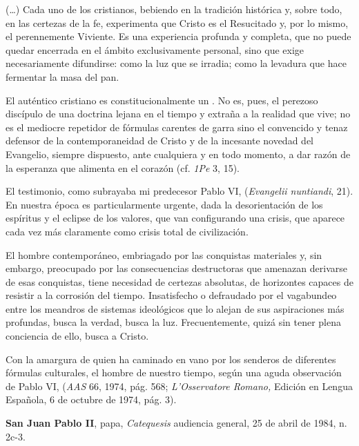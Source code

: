 \begin{patercite}
(\ldots) Cada uno de los cristianos, bebiendo en la tradición histórica y, sobre todo, en las certezas de la fe, experimenta que Cristo es el Resucitado y, por lo mismo, el perennemente Viviente. Es una experiencia profunda y completa, que no puede quedar encerrada en el ámbito exclusivamente personal, sino que exige necesariamente difundirse: como la luz que se irradia; como la levadura que hace fermentar la masa del pan.

El auténtico cristiano es constitucionalmente un . No es, pues, el perezoso discípulo de una doctrina lejana en el tiempo y extraña a la realidad que vive; no es el mediocre repetidor de fórmulas carentes de garra sino el convencido y tenaz defensor de la contemporaneidad de Cristo y de la incesante novedad del Evangelio, siempre dispuesto, ante cualquiera y en todo momento, a dar razón de la esperanza que alimenta en el corazón (cf. \emph{1Pe} 3, 15).

El testimonio, como subrayaba mi predecesor Pablo VI,  (\emph{Evangelii nuntiandi}, 21). En nuestra época es particularmente urgente, dada la desorientación de los espíritus y el eclipse de los valores, que van configurando una crisis, que aparece cada vez más claramente como crisis total de civilización.

El hombre contemporáneo, embriagado por las conquistas materiales y, sin embargo, preocupado por las consecuencias destructoras que amenazan derivarse de esas conquistas, tiene necesidad de certezas absolutas, de horizontes capaces de resistir a la corrosión del tiempo. Insatisfecho o defraudado por el vagabundeo entre los meandros de sistemas ideológicos que lo alejan de sus aspiraciones más profundas, busca la verdad, busca la luz. Frecuentemente, quizá sin tener plena conciencia de ello, busca a Cristo.

Con la amargura de quien ha caminado en vano por los senderos de diferentes fórmulas culturales, el hombre de nuestro tiempo, según una aguda observación de Pablo VI,  (\emph{AAS} 66, 1974, pág. 568; \emph{L'Osservatore Romano,} Edición en Lengua Española, 6 de octubre de 1974, pág. 3).

\textbf{San Juan Pablo II}, papa, \textit{Catequesis} audiencia general, 25 de abril de 1984, n. 2c-3. 
\end{patercite}

